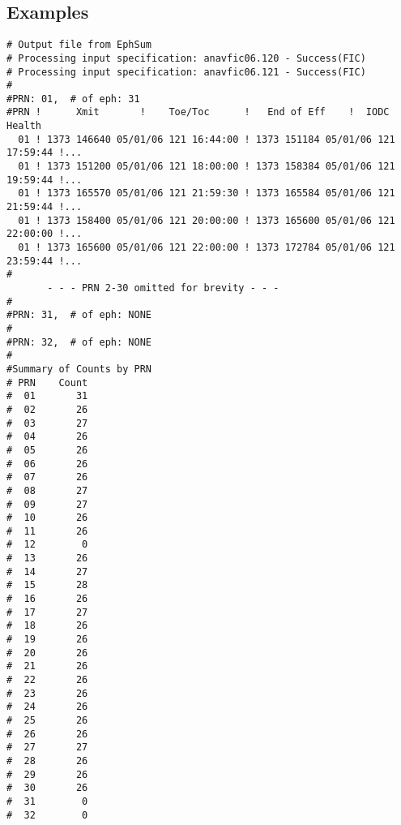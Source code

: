 \subsection{Examples}
\begin{\outputsize}
\begin{verbatim}
# Output file from EphSum
# Processing input specification: anavfic06.120 - Success(FIC)
# Processing input specification: anavfic06.121 - Success(FIC)
#
#PRN: 01,  # of eph: 31
#PRN !      Xmit       !    Toe/Toc      !   End of Eff    !  IODC   Health
  01 ! 1373 146640 05/01/06 121 16:44:00 ! 1373 151184 05/01/06 121 17:59:44 !... 
  01 ! 1373 151200 05/01/06 121 18:00:00 ! 1373 158384 05/01/06 121 19:59:44 !...
  01 ! 1373 165570 05/01/06 121 21:59:30 ! 1373 165584 05/01/06 121 21:59:44 !...
  01 ! 1373 158400 05/01/06 121 20:00:00 ! 1373 165600 05/01/06 121 22:00:00 !...
  01 ! 1373 165600 05/01/06 121 22:00:00 ! 1373 172784 05/01/06 121 23:59:44 !...
#
       - - - PRN 2-30 omitted for brevity - - -
#
#PRN: 31,  # of eph: NONE
#
#PRN: 32,  # of eph: NONE
#
#Summary of Counts by PRN
# PRN    Count
#  01       31
#  02       26
#  03       27
#  04       26
#  05       26
#  06       26
#  07       26
#  08       27
#  09       27
#  10       26
#  11       26
#  12        0
#  13       26
#  14       27
#  15       28
#  16       26
#  17       27
#  18       26
#  19       26
#  20       26
#  21       26
#  22       26
#  23       26
#  24       26
#  25       26
#  26       26
#  27       27
#  28       26
#  29       26
#  30       26
#  31        0
#  32        0
\end{verbatim}
\end{\outputsize}
%
